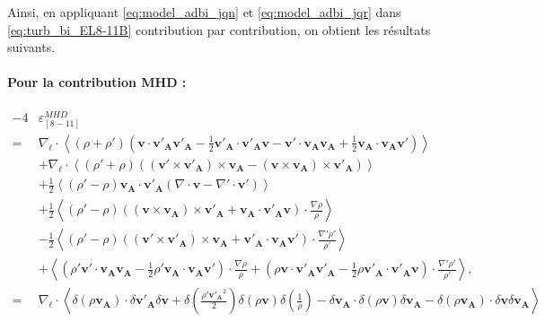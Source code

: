 Ainsi, en appliquant \eqref{eq:model_adbi_jqn} et \eqref{eq:model_adbi_jqr} dans \eqref{eq:turb_bi_EL8-11B} contribution par contribution, on obtient les résultats suivants.
\paragraph{Pour la contribution \ac{MHD} :} 
\begin{equation}\begin{array}{rl}
  \label{eq:turb_bin_TEMI}  -4&  \varepsilon^{MHD}_{[8-11]} \\%
    =&\nabla_{\boldsymbol{\ell}} \cdot  \left<( \rho + \rho' )( \boldsymbol{v} \cdot  \boldsymbol{v'_A}  \boldsymbol{v'_A} - \frac{1}{2} \boldsymbol{v'_A} \cdot \boldsymbol{v'_A} \boldsymbol{v} - \boldsymbol{v'} \cdot  \boldsymbol{v_A}  \boldsymbol{v_A} + \frac{1}{2} \boldsymbol{v_A} \cdot \boldsymbol{v_A} \boldsymbol{v'})\right> \\%
    &+ \nabla_{\boldsymbol{\ell}} \cdot \left< (\rho' + \rho) ((\boldsymbol{v'}  \times \boldsymbol{v'_A})\times \boldsymbol{v_A} -  (\boldsymbol{v}  \times \boldsymbol{v_A})\times \boldsymbol{v'_A})\right> \\%
    &+  \frac{1}{2}\left<(\rho' - \rho) \boldsymbol{v_A} \cdot \boldsymbol{v'_{A}} (  \nabla \cdot \boldsymbol{v}-  \nabla' \cdot \boldsymbol{v'})\right> \\%
  &+\frac{1}{2} \left<(\rho' - \rho) ( (\boldsymbol{v}  \times \boldsymbol{v_A})\times \boldsymbol{v'_A} + \boldsymbol{v_A} \cdot \boldsymbol{v'_{A}} \boldsymbol{v}) \cdot \frac{\nabla  \rho }{\rho}\right> \\%
  &- \frac{1}{2} \left<(\rho' - \rho)( (\boldsymbol{v'}  \times \boldsymbol{v'_A})\times \boldsymbol{v_A}  + \boldsymbol{v'_A} \cdot \boldsymbol{v_{A}} \boldsymbol{v'}) \cdot \frac{\nabla'  \rho' }{\rho'}\right> \\%
         &+ \left<( \rho'   \boldsymbol{v'} \cdot  \boldsymbol{v_A}  \boldsymbol{v_A} - \frac{1}{2} \rho' \boldsymbol{v_A} \cdot \boldsymbol{v_A} \boldsymbol{v'})\cdot  \frac{\nabla\rho}{\rho} 
         +(  \rho \boldsymbol{v} \cdot  \boldsymbol{v'_A}  \boldsymbol{v'_A} - \frac{1}{2} \rho \boldsymbol{v'_A} \cdot \boldsymbol{v'_A} \boldsymbol{v})\cdot \frac{\nabla'\rho'}{\rho'}     \right>, \\%
    =&\nabla_{\boldsymbol{\ell}} \cdot  \left< \delta (\rho \boldsymbol{v_A}) \cdot \delta \boldsymbol{v'_A} \delta \boldsymbol{v} + \delta(\frac{\rho' \boldsymbol{v'_A}^2}{2}) \delta( \rho \boldsymbol{v}) \delta (\frac{1}{\rho})-  \delta \boldsymbol{v_A}\cdot \delta (\rho \boldsymbol{v})\delta  \boldsymbol{v_A} -  \delta( \rho \boldsymbol{v_A}) \cdot \delta \boldsymbol{v} \delta \boldsymbol{v_A} \right>  \\%

\end{array}
\end{equation}
